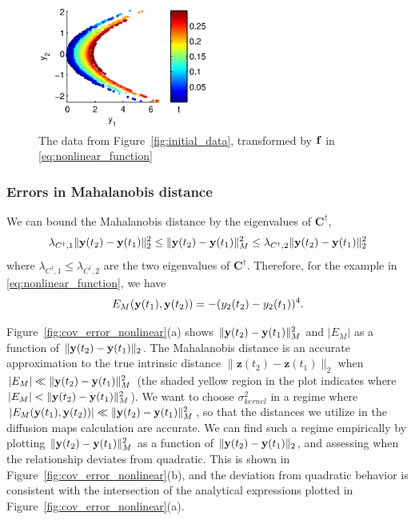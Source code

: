 \begin{figure}[t]
\centering
\includegraphics[width=0.5\textwidth]{data_init_nonlinear}
%
\caption[Nonlinear multiscale data]{The data from Figure~\ref{fig:initial_data}, transformed by $\mathbf{f}$ in \eqref{eq:nonlinear_function}}
\label{fig:initial_data_nonlinear}
\end{figure}

\subsubsection{Errors in Mahalanobis distance}

We can bound the Mahalanobis distance by the eigenvalues of $\mathbf{C}^{\dagger}$,
\begin{equation}
\lambda_{C^{\dagger},1} \| \mathbf{y}(t_2) - \mathbf{y}(t_1) \|_2^2
\le
\| \mathbf{y}(t_2) - \mathbf{y}(t_1) \|^2_M
\le
\lambda_{C^{\dagger},2} \| \mathbf{y}(t_2) - \mathbf{y}(t_1) \|_2^2
\end{equation}
where $\lambda_{C^{\dagger},1} \le \lambda_{C^{\dagger},2}$ are the two eigenvalues of $\mathbf{C}^{\dagger}$.
%
Therefore, for the example in \eqref{eq:nonlinear_function}, we have
\begin{equation}
E_M(\mathbf{y}(t_1), \mathbf{y}(t_2)) = - (y_2(t_2) - y_2(t_1))^4.
\end{equation}

Figure~\ref{fig:cov_error_nonlinear}(a) shows $\| \mathbf{y}(t_2) - \mathbf{y}(t_1) \|^2_M$ and $| E_M |$ as a function of $\| \mathbf{y}(t_2) - \mathbf{y}(t_1) \|_2$.
%
The Mahalanobis distance is an accurate approximation to the true intrinsic distance $\| \mathbf{z}(t_2) - \mathbf{z}(t_1) \|_2$ when $|E_M| \ll \| \mathbf{y}(t_2) - \mathbf{y}(t_1) \|^2_M$ (the shaded yellow region in the plot indicates where $|E_M| < \| \mathbf{y}(t_2) - \mathbf{y}(t_1) \|^2_M$).
%
We want to choose $\sigma_{kernel}^2$ in a regime where $|E_M(\mathbf{y}(t_1), \mathbf{y}(t_2))| \ll \| \mathbf{y}(t_2) - \mathbf{y}(t_1) \|^2_M$, so that the distances we utilize in the diffusion maps calculation are accurate.
%
We can find such a regime empirically by plotting $\| \mathbf{y}(t_2) - \mathbf{y}(t_1) \|^2_M$ as a function of $\| \mathbf{y}(t_2) - \mathbf{y}(t_1) \|_2$, and assessing when the relationship deviates from quadratic.
%
This is shown in Figure~\ref{fig:cov_error_nonlinear}(b), and the deviation from quadratic behavior is consistent with the intersection of the analytical expressions plotted in Figure~\ref{fig:cov_error_nonlinear}(a).

